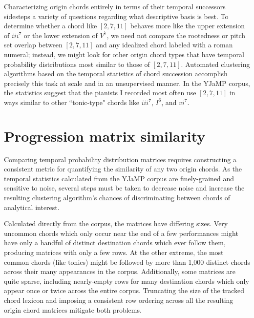 Characterizing origin chords entirely in terms of their temporal successors sidesteps a variety of questions regarding what descriptive basis is best.  To determine whether a chord like $[2,7,11]$ behaves more like the upper extension of $iii^7$ or the lower extension of $V^7$, we need not compare the rootedness or pitch set overlap between $[2,7,11]$ and any idealized chord labeled with a roman numeral; instead, we might look for other origin chord types that have temporal probability distributions most similar to those of $[2,7,11]$.  Automated clustering algorithms based on the temporal statistics of chord succession accomplish precisely this task at scale and in an unsupervised manner.  In the YJaMP corpus, the statistics suggest that the pianists I recorded most often use $[2,7,11]$ in ways similar to other ``tonic-type" chords like $iii^7$, $I^6$, and $vi^7$.

\section{Progression matrix similarity}
Comparing temporal probability distribution matrices requires constructing a consistent metric for quantifying the similarity of any two origin chords.  As the temporal statistics calculated from the YJaMP corpus are finely-grained and sensitive to noise, several steps must be taken to decrease noise and increase the resulting clustering algorithm's chances of discriminating between chords of analytical interest.

Calculated directly from the corpus, the matrices have differing sizes.  Very uncommon chords which only occur near the end of a few performances might have only a handful of distinct destination chords which ever follow them, producing matrices with only a few rows.  At the other extreme, the most common chords (like tonics) might be followed by more than 1,000 distinct chords across their many appearances in the corpus.  Additionally, some matrices are quite sparse, including nearly-empty rows for many destination chords which only appear once or twice across the entire corpus.  Truncating the size of the tracked chord lexicon and imposing a consistent row ordering across all the resulting origin chord matrices mitigate both problems.

